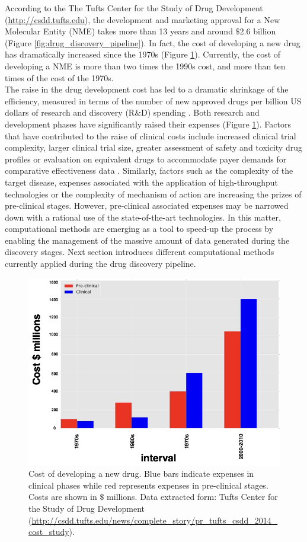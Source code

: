 \documentclass[11pt, b5paper,twoside]{tesi_upf}
\begin{document}
{\par  According to the The Tufts Center for the Study of Drug Development (\url{http://csdd.tufts.edu}), the development and marketing approval for a New Molecular Entity (NME) takes more than 13 years and around  $\$$2.6 billion (Figure \ref{fig:drug_discovery_pipeline}). In fact, the cost of developing a new drug has dramatically increased since the 1970s (Figure \ref{fig:drug_discovery_evolution}). Currently,  the cost of developing a NME is more than two times the 1990s cost, and more than ten times of the cost of the 1970s.   \\
The raise in the drug development cost has led to a dramatic shrinkage of the efficiency, measured in terms of the number of new approved drugs per billion US dollars of research and discovery (R$\&$D) spending \cite{Scannell2012}. Both research and development phases have significantly raised their expenses (Figure \ref{fig:drug_discovery_evolution}). Factors that have contributed to the raise of clinical costs include increased clinical trial complexity, larger clinical trial size, greater assessment of safety and toxicity drug profiles or evaluation on equivalent drugs to accommodate payer demands for comparative effectiveness data \cite{Scannell2012}. Similarly, factors such as the complexity of the target disease, expenses associated with the application of high-throughput technologies or the complexity of mechanism of action are increasing the prizes of pre-clinical stages. However, pre-clinical associated expenses may be narrowed down with a rational use of the state-of-the-art technologies. In this matter, computational methods are emerging as a tool to speed-up the process by enabling the management of the massive amount of data generated during the discovery stages. Next section introduces different computational methods currently applied during the drug discovery pipeline.  
\begin{figure}[htbp]
\centering
\includegraphics[width=0.9\linewidth]{../figures/drug_discovery_evolution.jpg}
	\caption[Evolution of drug development expenses over time]{Cost of developing a new drug. Blue bars indicate expenses in clinical phases while red represents expenses in pre-clinical stages. Costs are shown in $\$$ millions. Data extracted form: Tufts Center for the Study of Drug Development (\url{http://csdd.tufts.edu/news/complete_story/pr_tufts_csdd_2014_cost_study}).}
\label{fig:drug_discovery_evolution}
	

\end{figure}}
\end{document}
